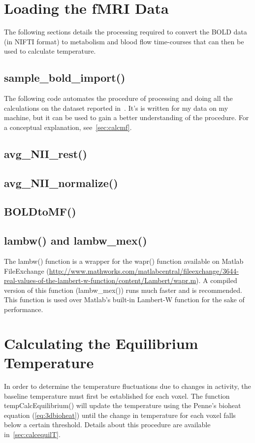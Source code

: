 \section{Loading the fMRI Data}
\label{sec:fmriprocessing}
The following sections details the processing required to convert the BOLD data (in NIFTI format) to metabolism and blood flow time-courses that can then be used to calculate temperature.
\subsection{sample\_bold\_import()}
The following code automates the procedure of processing and doing all the calculations on the dataset reported in~\citet{dhamala}.  It's is written for my data on my machine, but it can be used to gain a better understanding of the procedure. For a conceptual explanation, see~\cref{sec:calcmf}.

\subsection{avg\_NII\_rest()}

\subsection{avg\_NII\_normalize()}

\subsection{BOLDtoMF()}

\subsection{lambw() and lambw\_mex()}
The lambw() function is a wrapper for the wapr() function available on Matlab FileExchange (\url{http://www.mathworks.com/matlabcentral/fileexchange/3644-real-values-of-the-lambert-w-function/content/Lambert/wapr.m}).  A compiled version of this function (lambw\_mex()) runs much faster and is recommended.  This function is used over Matlab's built-in Lambert-W function for the sake of performance.

\clearpage
\section{Calculating the Equilibrium Temperature}
\label{sec:findequil}
In order to determine the temperature fluctuations due to changes in activity, the baseline temperature must first be established for each voxel.  The function tempCalcEquilibrium() will update the temperature using the Penne's bioheat equation (\cref{eq:3dbioheat}) until the change in temperature for each voxel falls below a certain threshold.  Details about this procedure are available in~\cref{sec:calcequilT}.
